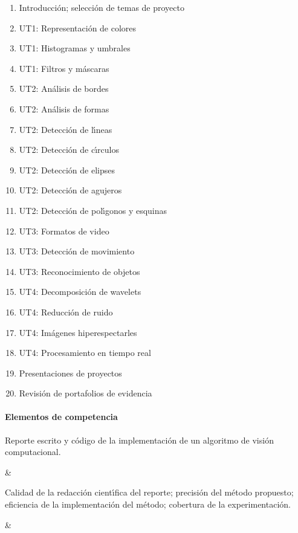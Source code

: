 \begin{enumerate}[itemsep=-3pt]
\item{Introducci\'{o}n; selecci\'{o}n de temas de proyecto}
\item{UT1: Representaci\'{o}n de colores}
\item{UT1: Histogramas y umbrales}
\item{UT1: Filtros y m\'{a}scaras}
\item{UT2: An\'{a}lisis de bordes}
\item{UT2: An\'{a}lisis de formas}
\item{UT2: Detecci\'{o}n de l\'{\i}neas}
\item{UT2: Detecci\'{o}n de c\'{\i}rculos}
\item{UT2: Detecci\'{o}n de elipses}
\item{UT2: Detecci\'{o}n de agujeros}
\item{UT2: Detecci\'{o}n de pol\'{\i}gonos y esquinas}
\item{UT3: Formatos de video}
\item{UT3: Detecci\'{o}n de movimiento}
\item{UT3: Reconocimiento de objetos}
\item{UT4: Decomposici\'{o}n de wavelets}
\item{UT4: Reducci\'{o}n de ruido}
\item{UT4: Im\'{a}genes hiperespectarles}
\item{UT4: Procesamiento en tiempo real}
\item{Presentaciones de proyectos}
\item{Revisi\'{o}n de portafolios de evidencia}
\end{enumerate}

\newpage

\paragraph{Elementos de competencia}

\quad



Reporte escrito y c\'{o}digo de la implementaci\'{o}n de un algoritmo
de visi\'{o}n computacional.

&

Calidad de la redacci\'{o}n cient\'{\i}fica del reporte; precisi\'{o}n
del m\'{e}todo propuesto; eficiencia de la implementaci\'{o}n del
m\'{e}todo; cobertura de la experimentaci\'{o}n.

&

